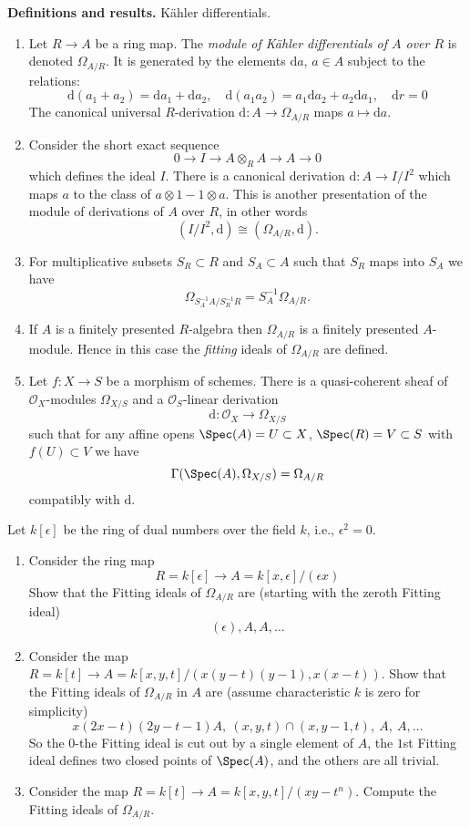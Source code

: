 \noindent
{\bf Definitions and results.} K\"ahler differentials.
\begin{enumerate}
\item Let $R \to A$ be a ring map. The {\it module of K\"ahler
differentials of $A$ over $R$} is denoted $\Omega_{A/R}$.
It is generated by the elements $\text{d}a$, $a \in A$
subject to the relations:
$$
\text{d}(a_1 + a_2) = \text{d}a_1 + \text{d}a_2,\quad
\text{d}(a_1a_2) = a_1\text{d}a_2 + a_2\text{d}a_1,\quad
\text{d}r = 0
$$
The canonical universal $R$-derivation $\text{d} : A \to \Omega_{A/R}$
maps $a\mapsto \text{d}a$.
\item Consider the short exact sequence
$$
0 \to I \to A \otimes_R A \to A \to 0
$$
which defines the ideal $I$. There is a canonical derivation
$\text{d} : A \to I/I^2$ which maps $a$ to the class of
$a \otimes 1 - 1 \otimes a$. This is another presentation of
the module of derivations of $A$ over $R$, in other words
$$
(I/I^2, \text{d}) \cong (\Omega_{A/R}, \text{d}).
$$
\item For multiplicative subsets $S_R \subset R$ and
$S_A \subset A$ such that $S_R$ maps into $S_A$ we have
$$
\Omega_{S_A^{-1}A / S_R^{-1}R} =
S_A^{-1}\Omega_{A/R}.
$$
\item If $A$ is a finitely presented $R$-algebra then
$\Omega_{A/R}$ is a finitely presented $A$-module. Hence in
this case the {\it fitting} ideals of $\Omega_{A/R}$ are defined.
\item Let $f : X \to S$ be a morphism of schemes. There is
a quasi-coherent sheaf of ${\mathcal O}_X$-modules $\Omega_{X/S}$
and a ${\mathcal O}_S$-linear derivation
$$
\text{d} : {\mathcal O}_X \longrightarrow \Omega_{X/S}
$$
such that for any affine opens $\Spec(A) = U \subset X$,
$\Spec(R) = V \subset S$
with $f(U) \subset V$ we have
$$
\Gamma(\Spec(A), \Omega_{X/S}) = \Omega_{A/R}
$$
compatibly with $\text{d}$.
\end{enumerate}

\begin{exercise}
\label{exercise-dual-numbers}
Let $k[\epsilon]$ be the ring of dual numbers
over the field $k$, i.e., $\epsilon^2 = 0$.
\begin{enumerate}
\item Consider the ring map
$$
R = k[\epsilon] \to A = k[x, \epsilon]/(\epsilon x)
$$
Show that the Fitting ideals of $\Omega_{A/R}$ are (starting with the
zeroth Fitting ideal)
$$
(\epsilon), A, A, \ldots
$$
\item Consider the map $R = k[t] \to
A = k[x, y, t]/(x(y-t)(y-1), x(x-t))$. Show that the Fitting ideals of
$\Omega_{A/R}$ in $A$ are (assume characteristic $k$ is zero
for simplicity)
$$
x(2x-t)(2y-t-1)A, \ (x, y, t)\cap (x, y-1, t), \ A, \ A, \ldots
$$
So the $0$-the Fitting ideal is cut out by a single element of $A$,
the $1$st Fitting ideal defines two closed points of $\Spec(A)$, and
the others are all trivial.
\item Consider the map $R = k[t] \to A = k[x, y, t]/(xy-t^n)$.
Compute the Fitting ideals of $\Omega_{A/R}$.
\end{enumerate}
\end{exercise}

